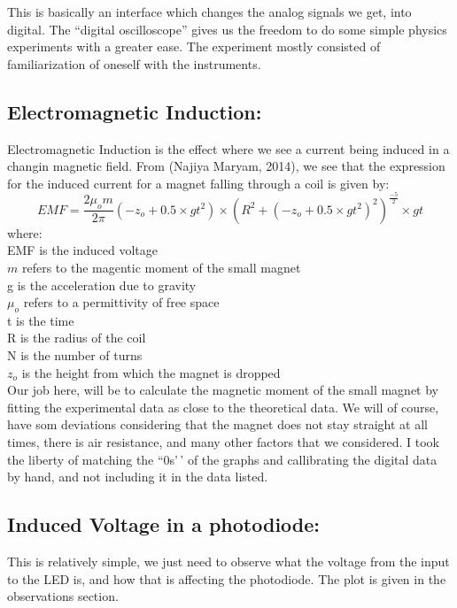 \documentclass{article}
\begin{document}
This is basically an interface which changes the analog signals we get, into digital. The ``digital oscilloscope'' gives us the freedom to do some simple physics experiments with a greater ease. The experiment mostly consisted of familiarization of oneself with the instruments.

\subsection{Electromagnetic Induction:}

Electromagnetic Induction is the effect where we see a current being induced in a changin magnetic field. From (Najiya Maryam, 2014), we see that the expression for the induced current for a magnet falling through a coil is given by:
\[ EMF = \frac{2\mu_o m}{2\pi}(-z_o+0.5\times gt^2) \times (R^2+(-z_o+0.5\times gt^2)^2)^\frac{-5}{2}\times gt \]
where:\\
EMF is the induced voltage\\
\(m\) refers to the magentic moment of the small magnet\\
g is the acceleration due to gravity\\
\(\mu_o\) refers to a permittivity of free space\\
t is the time\\
R is the radius of the coil\\
N is the number of turns\\
\(z_o\) is the height from which the magnet is dropped\\
Our job here, will be to calculate the magnetic moment of the small magnet by fitting the experimental data as close to the theoretical data. We will of course, have som deviations considering that the magnet does not stay straight at all times, there is air resistance, and many other factors that we considered. I took the liberty of matching the ``0s'\,' of the graphs and callibrating the digital data by hand, and not including it in the data listed.

\subsection{Induced Voltage in a photodiode:}

This is relatively simple, we just need to observe what the voltage from the input to the LED is, and how that is affecting the photodiode. The plot is given in the observations section.
\end{document}
